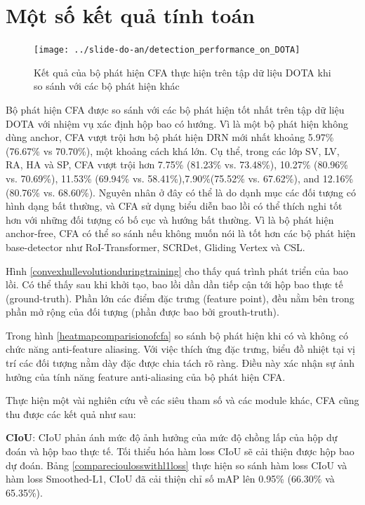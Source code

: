 \documentclass[12pt,a4paper,openany,oneside]{report}
\begin{document}
\chapter{Một số kết quả tính toán }
\begin{figure}
	\centering
	\texttt{[image: ../slide-do-an/detection\_performance\_on\_DOTA]}
	\caption{Kết quả của bộ phát hiện CFA thực hiện trên tập dữ liệu DOTA khi so sánh với các bộ phát hiện khác}
	\label{detectionperformanceondota}
\end{figure}

Bộ phát hiện CFA được so sánh với các bộ phát hiện tốt nhất trên tập dữ liệu DOTA với nhiệm vụ xác định hộp bao có hướng. Vì là một bộ phát hiện không dùng anchor, CFA vượt trội hơn bộ phát hiện DRN mới nhất khoảng 5.97\% (76.67\% vs 70.70\%), một khoảng cách khá lớn. Cụ thể, trong các lớp SV, LV, RA, HA và SP, CFA vượt trội hơn 7.75\% (81.23\% vs. 73.48\%), 10.27\% (80.96\% vs. 70.69\%), 11.53\% (69.94\% vs. 58.41\%),7.90\%(75.52\% vs. 67.62\%), and 12.16\% (80.76\% vs. 68.60\%). Nguyên nhân ở đây có thể là do dạnh mục các đối tượng có hình dạng bất thường, và CFA sử dụng biểu diễn bao lồi có thể thích nghi tốt hơn với những đối tượng có bố cục và hướng bất thường. Vì là bộ phát hiện anchor-free, CFA có thể so sánh nếu không muốn nói là tốt hơn các bộ phát hiện base-detector như RoI-Transformer, SCRDet, Gliding Vertex và CSL.

Hình \ref{convexhullevolutionduringtraining} cho thấy quá trình phát triển của bao lồi. Có thể thấy sau khi khởi tạo, bao lồi dần dần tiếp cận tới hộp bao thực tế (ground-truth). Phần lớn các điểm đặc trưng (feature point), đều nằm bên trong phần mở rộng của đối tượng (phần được bao bởi grouth-truth). 

Trong hình \ref{heatmapcomparisionofcfa} so sánh bộ phát hiện khi có và không có chức năng anti-feature aliasing. Với việc thích ứng đặc trưng, biểu đồ nhiệt tại vị trí các đối tượng nằm dày đặc được chia tách rõ ràng. Điều này xác nhận sự ảnh hưởng của tính năng feature anti-aliasing của bộ phát hiện CFA.

Thực hiện một vài nghiên cứu về các siêu tham số và các module khác, CFA cũng thu được các kết quả như sau:

\textbf{CIoU}: CIoU phản ánh mức độ ảnh hưởng của mức độ chồng lấp của hộp dự đoán và hộp bao thực tế. Tối thiểu hóa hàm loss CIoU sẽ cải thiện được hộp bao dự đoán. Bảng \ref{comparecioulosswithl1loss} thực hiện so sánh hàm loss CIoU và hàm loss Smoothed-L1, CIoU đã cải thiện chỉ số mAP lên 0.95\% (66.30\% và 65.35\%).
\end{document}
